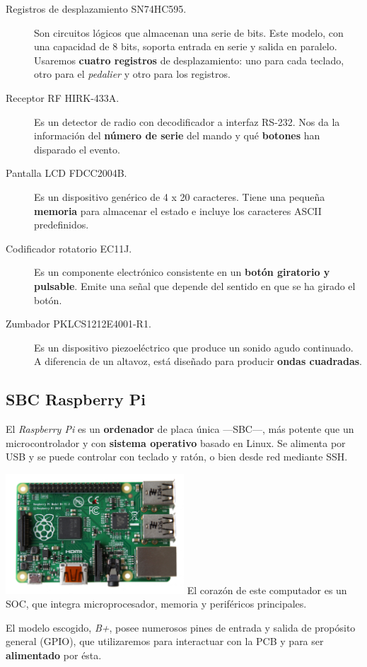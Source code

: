 \documentclass[10pt,a4paper]{article}
\begin{document}
	\begin{description}
		\item[Registros de desplazamiento SN74HC595.] Son circuitos lógicos que almacenan una serie de bits. Este modelo, con una capacidad de 8 bits, soporta entrada en serie y salida en paralelo. Usaremos \textbf{cuatro registros} de desplazamiento: uno para cada teclado, otro para el \textit{pedalier} y otro para los registros.
		
		\item[Receptor RF HIRK-433A.] Es un detector de radio con decodificador a interfaz RS-232. Nos da la información del \textbf{número de serie} del mando y qué \textbf{botones} han disparado el evento. 
		
		\item[Pantalla LCD FDCC2004B.] Es un dispositivo genérico de 4 x 20 caracteres. Tiene una pequeña \textbf{memoria} para almacenar el estado e incluye los caracteres ASCII predefinidos.
		
		\item[Codificador rotatorio EC11J.] Es un componente electrónico consistente en un \textbf{botón giratorio y pulsable}. Emite una señal que depende del sentido en que se ha girado el botón.
		
		\item[Zumbador PKLCS1212E4001-R1.] Es un dispositivo piezoeléctrico que produce un sonido agudo continuado. A diferencia de un altavoz, está diseñado para producir \textbf{ondas cuadradas}.
	\end{description}
	
	\subsection{SBC Raspberry Pi}
	
	El \textit{Raspberry Pi} es un \textbf{ordenador} de placa única ---SBC---, más potente que un microcontrolador y con \textbf{sistema operativo} basado en Linux. Se alimenta por USB y se puede controlar con teclado y ratón, o bien desde red mediante SSH.
	
	\begin{multicols}{2}
		\noindent
		\includegraphics[width=0.5\textwidth]{images/raspberry} 
		\columnbreak
		El corazón de este computador es un SOC, que integra microprocesador, memoria y periféricos principales.
		
		El modelo escogido, \textit{B+}, posee numerosos pines de entrada y salida de propósito general (GPIO), que utilizaremos para interactuar con la PCB y para ser \textbf{alimentado} por ésta.
	\end{multicols}
	
\end{document}
